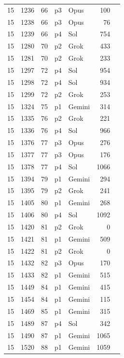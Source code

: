 \begin{longtable}{r r r l l r L{2.2in}}
15 & 1236 & 66 & p3 & Opus & 100 &  \\
15 & 1238 & 66 & p3 & Opus & 76 &  \\
15 & 1239 & 66 & p4 & Sol & 754 &  \\
15 & 1280 & 70 & p2 & Grok & 433 &  \\
15 & 1281 & 70 & p2 & Grok & 233 &  \\
15 & 1297 & 72 & p4 & Sol & 954 &  \\
15 & 1298 & 72 & p4 & Sol & 934 &  \\
15 & 1299 & 72 & p2 & Grok & 253 &  \\
15 & 1324 & 75 & p1 & Gemini & 314 &  \\
15 & 1335 & 76 & p2 & Grok & 221 &  \\
15 & 1336 & 76 & p4 & Sol & 966 &  \\
15 & 1376 & 77 & p3 & Opus & 276 &  \\
15 & 1377 & 77 & p3 & Opus & 176 &  \\
15 & 1378 & 77 & p4 & Sol & 1066 &  \\
15 & 1394 & 79 & p1 & Gemini & 294 &  \\
15 & 1395 & 79 & p2 & Grok & 241 &  \\
15 & 1405 & 80 & p1 & Gemini & 268 &  \\
15 & 1406 & 80 & p4 & Sol & 1092 &  \\
15 & 1420 & 81 & p2 & Grok & 0 &  \\
15 & 1421 & 81 & p1 & Gemini & 509 &  \\
15 & 1422 & 81 & p2 & Grok & 0 &  \\
15 & 1432 & 82 & p3 & Opus & 170 &  \\
15 & 1433 & 82 & p1 & Gemini & 515 &  \\
15 & 1449 & 84 & p1 & Gemini & 415 &  \\
15 & 1454 & 84 & p1 & Gemini & 115 &  \\
15 & 1469 & 85 & p1 & Gemini & 315 &  \\
15 & 1489 & 87 & p4 & Sol & 342 &  \\
15 & 1490 & 87 & p1 & Gemini & 1065 &  \\
15 & 1520 & 88 & p1 & Gemini & 1059 &  \\

\end{longtable}
